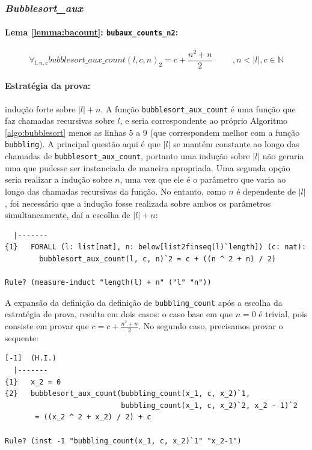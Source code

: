\subsubsection{\textit{Bubblesort\_aux}}

\paragraph{Lema \ref{lemma:bacount}: \texttt{bubaux\_counts\_n2}:}
\begin{equation*}
    \forall_{l,n,c} bubblesort\_aux\_count(l, c, n)_2 = c + \frac{n^2 + n}{2} \hspace{1cm}, n<|l|, c\in \mathbb{N}
\end{equation*}

\paragraph{Estratégia da prova:} indução forte sobre $|l| + n$. A função
\texttt{bubblesort\_aux\_count} é uma função que faz chamadas
recursivas sobre $l$, e seria correspondente ao próprio Algoritmo
\ref{algo:bubblesort} menos as linhas 5 a 9 (que correspondem melhor com
a função \texttt{bubbling}). A principal questão aqui é que $|l|$
se mantém constante ao longo das chamadas de \texttt{bubblesort\_aux\_count},
portanto uma indução sobre $|l|$ não geraria uma \HI que pudesse ser
instanciada de maneira apropriada.
Uma segunda opção seria realizar a indução sobre $n$, uma vez que ele
é o parâmetro que varia ao longo das chamadas recursivas da função. No
entanto, como $n$ é dependente de $|l|$, foi necessário que a indução
fosse realizada sobre ambos os parâmetros simultaneamente,
daí a escolha de $|l| + n$:
\begin{lstlisting}
  |-------
{1}   FORALL (l: list[nat], n: below[list2finseq(l)`length]) (c: nat):
        bubblesort_aux_count(l, c, n)`2 = c + ((n ^ 2 + n) / 2)

Rule? (measure-induct "length(l) + n" ("l" "n"))
\end{lstlisting} 

A expansão da definição da definição de \texttt{bubbling\_count} após a escolha
da estratégia de prova, resulta em dois casos: o caso base em que
$n=0$ é trivial, pois consiste em provar que $c = c + \frac{n^2 + n}{2}$.
No segundo caso, precisamos provar o sequente:

\begin{lstlisting}
[-1]  (H.I.)
  |-------
{1}   x_2 = 0
{2}   bubblesort_aux_count(bubbling_count(x_1, c, x_2)`1,
                           bubbling_count(x_1, c, x_2)`2, x_2 - 1)`2
       = ((x_2 ^ 2 + x_2) / 2) + c

Rule? (inst -1 "bubbling_count(x_1, c, x_2)`1" "x_2-1")
\end{lstlisting} 

